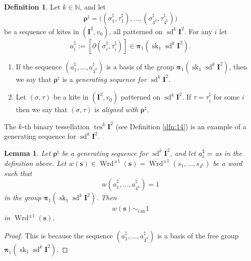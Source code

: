 \documentclass[10pt, a4paper]{amsart}
\newtheorem{lem}[equation]{Lemma}
\theoremstyle{definition}
\newtheorem{dfn}[equation]{Definition}
\numberwithin{equation}{section}
\newcommand{\opn}{\operatorname}
\newcommand{\mbf}[1]{\mathbf{#1}}
\newcommand{\mrm}[1]{\mathrm{#1}}
\newcommand{\mbb}[1]{\mathbb{#1}}
\newcommand{\bsym}[1]{\boldsymbol{#1}}
\newcommand{\N}{\mbb{N}}
\newcommand{\lb}{\linebreak}
\begin{document}
\begin{dfn} \label{dfn:33}
Let $k \in \N$, and let
\[ \bsym{\rho}^{\natural} = \bigl( (\sigma^{\natural}_1, \tau^{\natural}_1),
\ldots, (\sigma^{\natural}_{4^k}, \tau^{\natural}_{4^k}) \bigr) \]
be a sequence of kites in $(\mbf{I}^2, v_0)$, all patterned on 
$\opn{sd}^k \mbf{I}^2$.
For any $i$ let
\[ a^{\natural}_i := [\partial (\sigma^{\natural}_i, \tau^{\natural}_i)]
\in \bsym{\pi}_1(\opn{sk}_1 \opn{sd}^k \mbf{I}^2) . \]
\begin{enumerate}
\item If the sequence $(a^{\natural}_1, \ldots, a^{\natural}_{4^k})$
is a basis of the group 
$\bsym{\pi}_1(\opn{sk}_1 \opn{sd}^k \mbf{I}^2)$,
then we say that $\bsym{\rho}^{\natural}$ is a {\em generating sequence for
$\opn{sd}^k \mbf{I}^2$}.

\item Let $(\sigma, \tau)$ be a kite in $(\mbf{I}^2, v_0)$ patterned on 
$\opn{sd}^k \mbf{I}^2$. If $\tau = \tau^{\natural}_i$ for some $i$ then 
we say that $(\sigma, \tau)$ is {\em aligned with $\bsym{\rho}^{\natural}$}.
\end{enumerate}
\end{dfn}

The $k$-th binary tessellation $\opn{tes}^k \mbf{I}^2$ 
(see Definition \ref{dfn:14}) is an example of a 
generating sequence for $\opn{sd}^k \mbf{I}^2$.

\begin{lem} \label{lem:17}
Let $\bsym{\rho}^{\natural}$ be a generating sequence for 
$\opn{sd}^k \mbf{I}^2$, and let 
$a^{\natural}_i = \lb [\partial (\sigma^{\natural}_i, \tau^{\natural}_i)]$
as in the definition above.
Let 
$w(\bsym{s}) \in \opn{Wrd}^{\pm 1}(\bsym{s}) = \opn{Wrd}^{\pm 1}(s_1, \ldots,
s_{4^k})$ 
be a word such that 
\[ w(a^{\natural}_1, \ldots, a^{\natural}_{4^k}) = 1  \]
in the group $\bsym{\pi}_1(\opn{sk}_1 \opn{sd}^k \mbf{I}^2)$.
Then 
\[ w(\bsym{s}) \sim_{\mrm{can}} 1 \]
in $\opn{Wrd}^{\pm 1}(\bsym{s})$.
\end{lem}

\begin{proof}
This is because the sequence 
$(a^{\natural}_1, \ldots, a^{\natural}_{4^k})$
is a basis of the free group \linebreak
$\bsym{\pi}_1(\opn{sk}_1 \opn{sd}^k \mbf{I}^2)$.
\end{proof}
\end{document}
